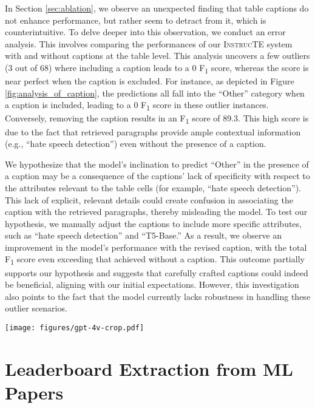 \documentclass[11pt]{article}
\begin{document}
{In Section \ref{sec:ablation}, we observe an unexpected finding that table captions do not enhance performance, but rather seem to detract from it, which is counterintuitive. To delve deeper into this observation, we conduct an error analysis. This involves comparing the performances of our \textsc{InstrucTE} system with and without captions at the table level. This analysis uncovers a few outliers (3 out of 68) where including a caption leads to a 0 F\textsubscript{1} score, whereas the score is near perfect when the caption is excluded.
For instance, as depicted in Figure \ref{fig:analysis_of_caption}, the predictions all fall into the ``Other'' category when a caption is included, leading to a 0 F\textsubscript{1} score in these outlier instances. Conversely, removing the caption results in an F\textsubscript{1} score of 89.3. This high score is due to the fact that retrieved paragraphs provide ample contextual information (e.g., ``hate speech detection'') even without the presence of a caption.


We hypothesize that the model's inclination to predict ``Other'' in the presence of a caption may be a consequence of the captions' lack of specificity with respect to the attributes relevant to the table cells (for example, ``hate speech detection''). This lack of explicit, relevant details could create confusion in associating the caption with the retrieved paragraphs, thereby misleading the model.
To test our hypothesis, we manually adjust the captions to include more specific attributes, such as ``hate speech detection'' and ``T5-Base.'' As a result, we observe an improvement in the model's performance with the revised caption, with the total F\textsubscript{1} score even exceeding that achieved without a caption. This outcome partially supports our hypothesis and suggests that carefully crafted captions could indeed be beneficial, aligning with our initial expectations. However, this investigation also points to the fact that the model currently lacks robustness in handling these outlier scenarios.


\begin{figure*}[ht!]
    \centering
    \texttt{[image: figures/gpt-4v-crop.pdf]}
    \caption{Generate \LaTeX~code for image tables using GPT-4V. 
}
    \label{fig:gpt-4v}
\end{figure*}


\section{Leaderboard Extraction from ML Papers}
\label{sec:axcell_details}

}
\end{document}
